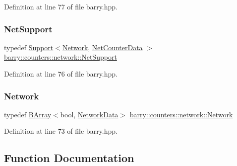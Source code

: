 Definition at line 77 of file barry.\+hpp.

\mbox{\label{namespacebarry_1_1counters_1_1network_a4d30be7f465efd7d218f0264f8386b32}} 
\subsubsection{\texorpdfstring{Net\+Support}{NetSupport}}
{\footnotesize\ttfamily typedef \hyperlink{classbarry_1_1_support}{Support}$<$\hyperlink{namespacebarry_1_1counters_1_1network_a4cb88d4572ded3b447ea269c9cd0b2c0}{Network}, \hyperlink{classbarry_1_1counters_1_1network_1_1_net_counter_data}{Net\+Counter\+Data} $>$ \hyperlink{namespacebarry_1_1counters_1_1network_a4d30be7f465efd7d218f0264f8386b32}{barry\+::counters\+::network\+::\+Net\+Support}}



Definition at line 76 of file barry.\+hpp.

\mbox{\label{namespacebarry_1_1counters_1_1network_a4cb88d4572ded3b447ea269c9cd0b2c0}} 
\subsubsection{\texorpdfstring{Network}{Network}}
{\footnotesize\ttfamily typedef \hyperlink{classbarry_1_1_b_array}{B\+Array}$<$bool, \hyperlink{classbarry_1_1counters_1_1network_1_1_network_data}{Network\+Data}$>$ \hyperlink{namespacebarry_1_1counters_1_1network_a4cb88d4572ded3b447ea269c9cd0b2c0}{barry\+::counters\+::network\+::\+Network}}



Definition at line 73 of file barry.\+hpp.



\subsection{Function Documentation}
\mbox{\label{namespacebarry_1_1counters_1_1network_acc210d80021cb5a79f1a9daf097e1c99}} 

